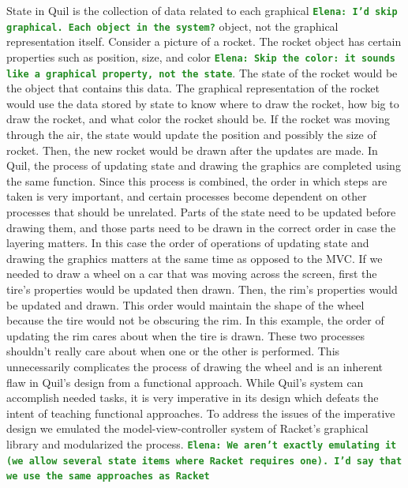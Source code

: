 \documentclass[12pt]{article}
\newcommand{\comment}[1]{{\bf \tt  {#1}}}
\newcommand{\emcomment}[1]{\textcolor{ForestGreen}{\comment{Elena: {#1}}}}
\begin{document}
State in Quil is the collection of data related to each graphical \emcomment{I'd skip graphical. Each object in the system?} object, not the graphical representation itself. Consider a picture of a rocket. The rocket object has certain properties such as position, size, and color \emcomment{Skip the color: it sounds like a graphical property, not the state}. The state of the rocket would be the object that contains this data. The graphical representation of the rocket would use the data stored by state to know where to draw the rocket, how big to draw the rocket, and what color the rocket should be. If the rocket was moving through the air, the state would update the position and possibly the size of rocket. Then, the new rocket would be drawn after the updates are made. In Quil, the process of updating state and drawing the graphics are completed using the same function. Since this process is combined, the order in which steps are taken is very important, and certain processes %
become dependent on other processes that should be unrelated. Parts of the state need to be updated before drawing them, and those parts need to be drawn in the correct order in case the layering matters. In this case the order of operations of updating state and drawing the graphics matters at the same time as opposed to the MVC. If we needed to draw a wheel on a car that was moving across the screen, first the tire's properties would be updated then drawn. Then, the rim's properties would be updated and drawn. This order would maintain the shape of the wheel because the tire would not be obscuring the rim. In this example, the order of updating the rim cares about when the tire is drawn. These two processes shouldn't really care about when one or the other is performed. This unnecessarily complicates the process of drawing the wheel and is an inherent flaw in Quil's design from a functional approach. While Quil's system can accomplish needed tasks, it is very imperative in its design which defeats the intent of teaching functional approaches. To address the issues of the imperative design we emulated the model-view-controller system of Racket's graphical library and modularized the process. \emcomment{We aren't exactly emulating it (we allow several state items where Racket requires one). I'd say that we use the same approaches as Racket}
\end{document}
